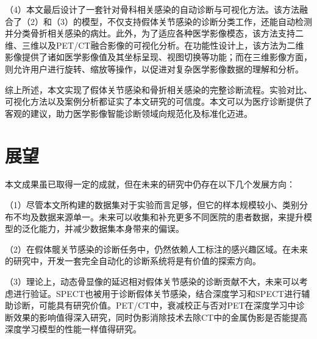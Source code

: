 （4）本文最后设计了一套针对骨科相关感染的自动诊断与可视化方法。该方法融合了（2）和（3）的模型，不仅支持假体关节感染的诊断分类工作，还能自动检测并分类骨折相关感染的病灶。此外，为了适应各种医学影像模态，该方法支持二维、三维以及PET/CT融合影像的可视化分析。在功能性设计上，该方法为二维影像提供了诸如医学影像值及其坐标呈现、视图切换等功能；而在三维影像方面，则允许用户进行旋转、缩放等操作，以促进对复杂医学影像数据的理解和分析。

综上所述，本文实现了假体关节感染和骨折相关感染的完整诊断流程。实验对比、可视化方法以及案例分析都证实了本文研究的可信度。本文可以为医疗诊断提供了客观的建议，助力医学影像智能诊断领域向规范化及标准化迈进。

\section{展望}

本文成果虽已取得一定的成就，但在未来的研究中仍存在以下几个发展方向：

（1）尽管本文所构建的数据集对于实验而言足够，但它的样本规模较小、类别分布不均及数据来源单一。未来可以收集和补充更多不同医院的患者数据，来提升模型的泛化能力，并减少数据集本身带来的偏误。

（2）在假体髋关节感染的诊断任务中，仍然依赖人工标注的感兴趣区域。在未来的研究中，开发一套完全自动化的诊断系统将是有价值的探索方向。

（3）理论上，动态骨显像的延迟相对假体关节感染的诊断贡献不大，未来可以考虑进行验证。SPECT也被用于诊断假体关节感染，结合深度学习和SPECT进行辅助诊断，可能具有研究价值。PET/CT中，衰减校正与否对PET在深度学习中诊断效果的影响值得深入研究，同时伪影消除技术去除CT中的金属伪影是否能提高深度学习模型的性能一样值得研究。